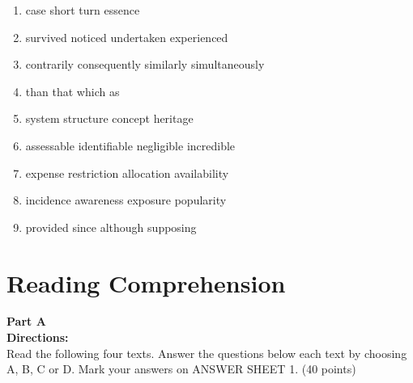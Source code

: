 \begin{enumerate}
\item


\fourchoices
{case}
{short}
{turn}
{essence}




\item

\fourchoices
{survived}
{noticed}
{undertaken}
{experienced}



\item

\fourchoices
{contrarily}
{consequently}
{similarly}
{simultaneously}


\item


\fourchoices
{than}
{that}
{which}
{as}




\item


\fourchoices
{system}
{structure}
{concept}
{heritage}




\item

\fourchoices
{assessable}
{identifiable}
{negligible}
{incredible}


\item

\fourchoices
{expense}
{restriction}
{allocation}
{availability}



\item

\fourchoices
{incidence}
{awareness}
{exposure}
{popularity}



\item


\fourchoices
{provided}
{since}
{although}
{supposing}



\end{enumerate}


\hfil

\section{Reading Comprehension}



\noindent
\textbf{Part A}\\
\textbf{Directions:}\\
Read the following four texts. Answer the questions below each
	text by choosing A, B, C or
	D. Mark your answers
	on ANSWER SHEET 1. (40 points)

